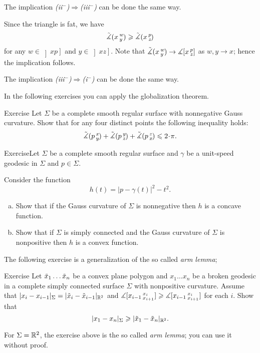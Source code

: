 The implication \textit{(ii$^{-}$)$\Longrightarrow$(iii$^{-}$)} can be done the same way.

Since the triangle is fat, we have 
\[\angk xwy \ge \angk xpz\]
for any $w\in \left]xp\right]$ and $y\in \left]xz\right]$.
Note that $\angk xwy\to \measuredangle\hinge xpz$ as $w,y\to x$; hence the implication follows.

The implication \textit{(iii$^{-}$)$\Longrightarrow$(i$^{-}$)} can be done the same way.
\qeds

In the following exercises you can apply the globalization theorem.

\begin{thm}{Exercise}
Let $\Sigma$ be a complete smooth regular surface with nonnegative Gauss curvature.
Show that for any four distinct points the following inequality holds:
\[\angk pxy+\angk pyz+\angk pzx\le2\cdot \pi.\]

\end{thm}

\begin{thm}{Exercise}Let $\Sigma$ be a complete smooth regular surface
and $\gamma$ be a unit-speed geodesic in $\Sigma$ and $p\in\Sigma$.

Consider the function
\[h(t)=|p-\gamma(t)|^2-t^2.\]

\begin{enumerate}[(a)]
\item Show that if the Gauss curvature of $\Sigma$ is nonnegative then $h$ is a concave function.
\item Show that if $\Sigma$ is simply connected and the Gauss curvature of $\Sigma$ is nonpositive then $h$ is a convex function.
\end{enumerate}
\end{thm}

The following exercise is a generalization of the so called \emph{arm lemma};

\begin{thm}{Exercise}
Let $\~x_1\dots\~x_n$ be a convex plane polygon and
$x_1\dots x_n$ be a broken geodesic in a complete simply connected surface $\Sigma$ with nonpositive curvature.
Assume that
$|x_i-x_{i-1}|_\Sigma=|\~x_i-\~x_{i-1}|_{\RR^2}$ and
$\measuredangle\hinge{x_{i-1}}{x_i}{x_{i+1}}\ge \measuredangle\hinge{x_{i-1}}{x_i}{x_{i+1}}$
 for each $i$.
Show that \[|x_1-x_n|_\Sigma\ge |\~x_1\z-\~x_n|_{\RR^2}.\]
\end{thm}

For $\Sigma=\RR^2$, the exercise above is the so called \emph{arm lemma}; you can use it without proof.

